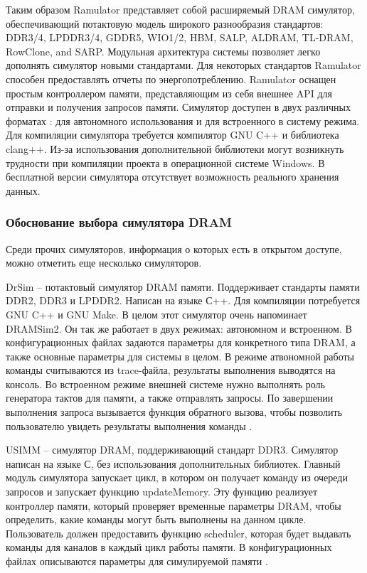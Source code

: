 Таким образом Ramulator представляет собой расширяемый DRAM симулятор, обеспечивающий потактовую модель широкого разнообразия стандартов: DDR3/4, LPDDR3/4, GDDR5, WIO1/2, HBM, SALP, ALDRAM, TL-DRAM, RowClone, and SARP. Модульная архитектура системы позволяет легко дополнять симулятор новыми стандартами. Для некоторых стандартов Ramulator способен предоставлять отчеты по энергопотреблению. Ramulator оснащен простым контроллером памяти, представляющим из себя внешнее API для отправки и получения запросов памяти. Симулятор доступен в двух различных форматах : для автономного использования и для встроенного в систему режима. Для компиляции симулятора требуется компилятор GNU C++ и библиотека clang++. Из-за использования дополнительной библиотеки могут возникнуть трудности при компиляции проекта в операционной системе Windows. В бесплатной версии симулятора отсутствует возможность реального хранения данных.

\subsubsection{Обоснование выбора симулятора DRAM}
\label{sub:domain:simulators:simulator_choice}
Среди прочих симуляторов, информация о которых есть в открытом доступе, можно отметить еще несколько симуляторов. 

DrSim – потактовый симулятор DRAM памяти. Поддерживает стандарты памяти DDR2, DDR3 и LPDDR2. Написан на языке С++. Для компиляции потребуется GNU C++ и GNU Make. В целом этот симулятор очень напоминает DRAMSim2. Он так же работает в двух режимах: автономном и встроенном. В конфигурационных файлах задаются параметры для конкретного типа DRAM, а также основные параметры для системы в целом. В режиме атвономной работы команды считываются из trace-файла, результаты выполнения выводятся на консоль. Во встроенном режиме внешней системе нужно выполнять роль генератора тактов для памяти, а также отправлять запросы. По завершении выполнения запроса вызывается функция обратного вызова, чтобы позволить пользователю увидеть результаты выполнения команды \cite{drsim_manual}.

USIMM – симулятор DRAM, поддерживающий стандарт DDR3. Симулятор написан на языке С, без использования дополнительных библиотек. Главный модуль симулятора запускает цикл, в котором он получает команду из очереди запросов и запускает функцию updateMemory. Эту функцию реализует контроллер памяти, который проверяет временные параметры DRAM, чтобы определить, какие команды могут быть выполнены на данном цикле. Пользователь должен предоставить функцию scheduler, которая будет выдавать команды для каналов в каждый цикл работы памяти. В конфигурационных файлах описываются параметры для симулируемой памяти \cite{usimm_manual}. 

